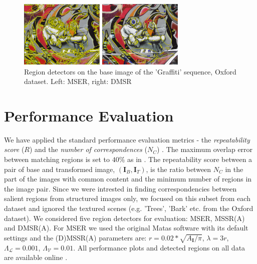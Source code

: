 \documentclass[conference,compsoc]{IEEEtran}
\def\I{{\mathbf I}}
\def\mcL{{\mathcal{L}}}
\def\mcV{{\mathcal{V}}}
\begin{document}
\begin{figure}[htb]

\begin{minipage}[b]{.49\linewidth}
  \centering
  \centerline{\includegraphics[width=4.0cm]{mserGraffiti1}}
\end{minipage}
\hfill
\begin{minipage}[b]{0.49\linewidth}
  \centering
  \centerline{\includegraphics[width=4.0cm]{dmsrGraffiti1}}
\end{minipage}
\vspace{-0.25cm}
\caption{Region detectors on the base image of the 'Graffiti' sequence, Oxford dataset. Left: MSER, right: DMSR}
\label{fig:det_graffiti}
%
\end{figure}
\section{Performance  Evaluation}
\label{sec:perf}


We have applied the standard performance evaluation metrics - the {\em repeatability score} ($R$) and the {\em number of correspondences} ($N_C$) \cite{Mikolajczyk:2005}. The maximum overlap error between matching regions is set to $40\%$ as in \cite{Mikolajczyk:2005}. The repeatability score between a pair of base and transformed image, $(\I_B,\I_T)$, is the ratio between $N_C$ in the part of the images with common content and the minimum number of regions in the image pair. Since we were intrested in finding correspondencies between salient regions from structured images only, we focused on this subset from each dataset and ignored the textured scenes (e.g. 'Trees', 'Bark' etc. from the Oxford dataset). We considered five region detectors for evaluation: MSER, MSSR(A) and DMSR(A). For MSER we used the original Matas software with its default settings and the (D)MSSR(A) parameters are: $r = 0.02*\sqrt{A_{\I} / \pi}$, $\lambda=3r$, $\Lambda_{\mcL}=0.001$, $\Lambda_{\mcV}=0.01$.
All performance plots and detected regions on all data are available online \cite{elena_ranguelova_2016_45156}.
\end{document}
